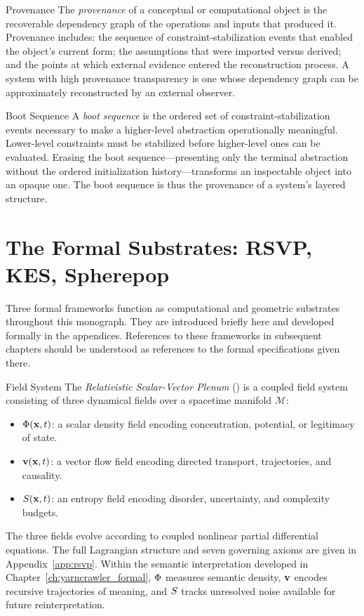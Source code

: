 \begin{definition}{Provenance}
The \emph{provenance} of a conceptual or computational object is the recoverable
dependency graph of the operations and inputs that produced it. Provenance includes:
the sequence of constraint-stabilization events that enabled the object's current
form; the assumptions that were imported versus derived; and the points at which
external evidence entered the reconstruction process. A system with high provenance
transparency is one whose dependency graph can be approximately reconstructed by an
external observer.
\end{definition}

\begin{definition}{Boot Sequence}
A \emph{boot sequence} is the ordered set of constraint-stabilization events
necessary to make a higher-level abstraction operationally meaningful. Lower-level
constraints must be stabilized before higher-level ones can be evaluated. Erasing
the boot sequence---presenting only the terminal abstraction without the ordered
initialization history---transforms an inspectable object into an opaque one. The
boot sequence is thus the provenance of a system's layered structure.
\end{definition}

\section{The Formal Substrates: RSVP, KES, Spherepop}

Three formal frameworks function as computational and geometric substrates throughout
this monograph. They are introduced briefly here and developed formally in the
appendices. References to these frameworks in subsequent chapters should be understood
as references to the formal specifications given there.

\begin{definition}{\RSVP Field System}
The \emph{Relativistic Scalar-Vector Plenum} (\RSVP) is a coupled field system
consisting of three dynamical fields over a spacetime manifold $\mathcal{M}$:
\begin{itemize}
  \item $\Phi(\mathbf{x}, t)$: a scalar density field encoding concentration,
        potential, or legitimacy of state.
  \item $\mathbf{v}(\mathbf{x}, t)$: a vector flow field encoding directed transport,
        trajectories, and causality.
  \item $S(\mathbf{x}, t)$: an entropy field encoding disorder, uncertainty,
        and complexity budgets.
\end{itemize}
The three fields evolve according to coupled nonlinear partial differential equations.
The full Lagrangian structure and seven governing axioms are given in
Appendix~\ref{app:rsvp}. Within the semantic interpretation developed in
Chapter~\ref{ch:yarncrawler_formal}, $\Phi$ measures semantic density, $\mathbf{v}$
encodes recursive trajectories of meaning, and $S$ tracks unresolved noise
available for future reinterpretation.
\end{definition}

